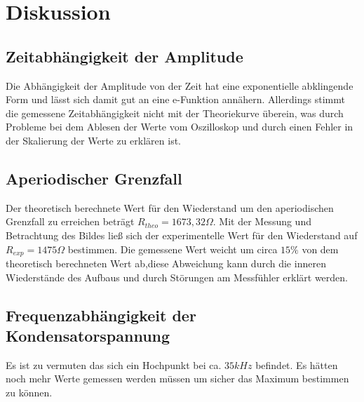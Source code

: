 \newpage
\section{Diskussion}
\label{sec:Diskussion}
\subsection{Zeitabhängigkeit der Amplitude}
Die Abhängigkeit der Amplitude von der Zeit hat eine exponentielle abklingende Form und lässt sich damit gut an eine e-Funktion annähern.
Allerdings stimmt die gemessene Zeitabhängigkeit nicht mit der Theoriekurve überein, was durch Probleme bei dem Ablesen der Werte vom Oszilloskop
und durch einen Fehler in der Skalierung der Werte zu erklären ist.
\subsection{Aperiodischer Grenzfall}
Der theoretisch berechnete Wert für den Wiederstand um den aperiodischen Grenzfall zu erreichen beträgt $R_{theo}=1673,32 \Omega$.
Mit der Messung und Betrachtung des Bildes ließ sich der experimentelle Wert für den Wiederstand auf $R_{exp} = 1475\Omega$ bestimmen.
Die gemessene Wert weicht um circa $15\%$ von dem theoretisch berechneten Wert ab,diese Abweichung kann durch die inneren Wiederstände des Aufbaus und durch Störungen am Messfühler erklärt werden.

\subsection{Frequenzabhängigkeit der Kondensatorspannung}
Es ist zu vermuten das sich ein Hochpunkt bei ca. $35kHz$ befindet.
Es hätten noch mehr Werte gemessen werden müssen um sicher das Maximum bestimmen zu können.